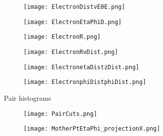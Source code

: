 \documentclass{beamer}
\begin{document}
\begin{frame}
  \begin{figure}[h!]
  \centering
  \texttt{[image: ElectronDistvE0E.png]}
  \end{figure}
\end{frame}

\begin{frame}
  \begin{figure}[h!]
  \centering
  \texttt{[image: ElectronEtaPhiD.png]}
  \end{figure}
\end{frame}

\begin{frame}
  \begin{figure}[h!]
  \centering
  \texttt{[image: ElectronR.png]}
  \end{figure}
\end{frame}

\begin{frame}
  \begin{figure}[h!]
  \centering
  \texttt{[image: ElectronRvDist.png]}
  \end{figure}
\end{frame}

\begin{frame}
  \begin{figure}[h!]
  \centering
  \texttt{[image: ElectronetaDistzDist.png]}
  \end{figure}
\end{frame}

\begin{frame}
  \begin{figure}[h!]
  \centering
  \texttt{[image: ElectronphiDistphiDist.png]}
  \end{figure}
\end{frame}

\begin{frame}
  \begin{center}
 	\Huge Pair histograms
 	\end{center}
\end{frame}

\begin{frame}
  \begin{figure}[h!]
  \centering
  \texttt{[image: PairCuts.png]}
  \end{figure}
\end{frame}

\begin{frame}
  \begin{figure}[h!]
  \centering
  \texttt{[image: MotherPtEtaPhi\_projectionX.png]}
  \end{figure}
\end{frame}
\end{document}
